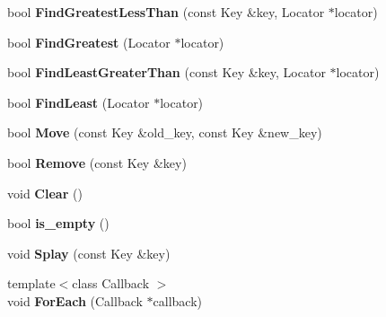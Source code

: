\begin{DoxyCompactItemize}
\item 
\hypertarget{classv8_1_1internal_1_1_splay_tree_a1017cfc30654ba532f6039eff73de8c8}{}bool {\bfseries Find\+Greatest\+Less\+Than} (const Key \&key, Locator $\ast$locator)\label{classv8_1_1internal_1_1_splay_tree_a1017cfc30654ba532f6039eff73de8c8}

\item 
\hypertarget{classv8_1_1internal_1_1_splay_tree_aa9c4bffb3e15a22809a9014f374530e1}{}bool {\bfseries Find\+Greatest} (Locator $\ast$locator)\label{classv8_1_1internal_1_1_splay_tree_aa9c4bffb3e15a22809a9014f374530e1}

\item 
\hypertarget{classv8_1_1internal_1_1_splay_tree_a95fb504c2fa06a211446d983e689e944}{}bool {\bfseries Find\+Least\+Greater\+Than} (const Key \&key, Locator $\ast$locator)\label{classv8_1_1internal_1_1_splay_tree_a95fb504c2fa06a211446d983e689e944}

\item 
\hypertarget{classv8_1_1internal_1_1_splay_tree_a1379eb90062c1a6b9e7173792d651e86}{}bool {\bfseries Find\+Least} (Locator $\ast$locator)\label{classv8_1_1internal_1_1_splay_tree_a1379eb90062c1a6b9e7173792d651e86}

\item 
\hypertarget{classv8_1_1internal_1_1_splay_tree_a401e85c47e6fc90f75ac37220d2a4bc2}{}bool {\bfseries Move} (const Key \&old\+\_\+key, const Key \&new\+\_\+key)\label{classv8_1_1internal_1_1_splay_tree_a401e85c47e6fc90f75ac37220d2a4bc2}

\item 
\hypertarget{classv8_1_1internal_1_1_splay_tree_a193702074e0c336766c28e68a8355c34}{}bool {\bfseries Remove} (const Key \&key)\label{classv8_1_1internal_1_1_splay_tree_a193702074e0c336766c28e68a8355c34}

\item 
\hypertarget{classv8_1_1internal_1_1_splay_tree_a1ff226e5ca35dc162b0c5f878a7e6d8f}{}void {\bfseries Clear} ()\label{classv8_1_1internal_1_1_splay_tree_a1ff226e5ca35dc162b0c5f878a7e6d8f}

\item 
\hypertarget{classv8_1_1internal_1_1_splay_tree_ad2d753c67a570c9d879fbf958b89feaa}{}bool {\bfseries is\+\_\+empty} ()\label{classv8_1_1internal_1_1_splay_tree_ad2d753c67a570c9d879fbf958b89feaa}

\item 
\hypertarget{classv8_1_1internal_1_1_splay_tree_aea827bdddbd85bf3b188f8b6c9a5a298}{}void {\bfseries Splay} (const Key \&key)\label{classv8_1_1internal_1_1_splay_tree_aea827bdddbd85bf3b188f8b6c9a5a298}

\item 
\hypertarget{classv8_1_1internal_1_1_splay_tree_a86bc3543b4ba7a00ea043ce4b08d8fae}{}{\footnotesize template$<$class Callback $>$ }\\void {\bfseries For\+Each} (Callback $\ast$callback)\label{classv8_1_1internal_1_1_splay_tree_a86bc3543b4ba7a00ea043ce4b08d8fae}

\end{DoxyCompactItemize}
